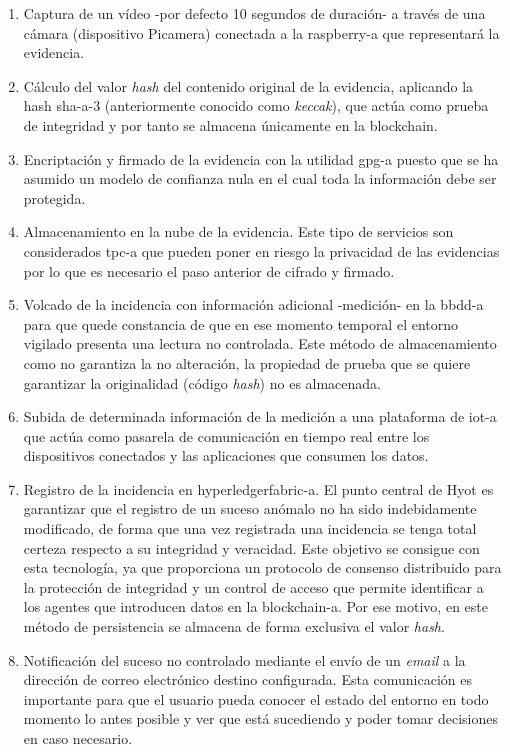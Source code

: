 \documentclass[12pt,a4paper, twoside]{report}
\begin{document}
	\begin{enumerate}
		\item Captura de un vídeo -por defecto 10 segundos de duración- a través de una cámara (dispositivo Picamera) conectada a la \gls{raspberry-a} que representará la evidencia.
		\item Cálculo del valor \textit{hash} del contenido original de la evidencia, aplicando la \gls{hash} \gls{sha-a}-3 (anteriormente conocido como \textit{keccak}), que actúa como prueba de integridad y por tanto se almacena únicamente en la \Gls{blockchain}. 
		\item Encriptación y firmado de la evidencia con la utilidad \gls{gpg-a} puesto que se ha asumido un modelo de confianza nula en el cual toda la información debe ser protegida.
		\item Almacenamiento en la nube de la evidencia. Este tipo de servicios son considerados \gls{tpc-a} que pueden poner en riesgo la privacidad de las evidencias por lo que es necesario el paso anterior de cifrado y firmado.	
		\item Volcado de la incidencia con información adicional -medición- en la \gls{bbdd-a} para que quede constancia de que en ese momento temporal el entorno vigilado presenta una lectura no controlada. Este método de almacenamiento como no garantiza la no alteración, la propiedad de prueba que se quiere garantizar la originalidad (código \textit{hash}) no es almacenada.
		\item Subida de determinada información de la medición a una plataforma de \gls{iot-a} que actúa como pasarela de comunicación en tiempo real entre los dispositivos conectados y las aplicaciones que consumen los datos. %
		\item Registro de la incidencia	en \gls{hyperledgerfabric-a}. El punto central de Hyot es garantizar que el registro de un suceso anómalo no ha sido indebidamente modificado, de forma que una vez registrada una incidencia se tenga total certeza respecto a su integridad y veracidad. Este objetivo se consigue con esta tecnología, ya que proporciona un protocolo de consenso distribuido para la protección de integridad y un control de acceso que permite identificar a los agentes que introducen datos en la \Gls{blockchain-a}. Por ese motivo, en este método de persistencia se almacena de forma exclusiva el valor \textit{hash}.

		\item Notificación del suceso no controlado mediante el envío de un \textit{email} a la dirección de correo electrónico destino configurada. Esta comunicación es importante para que el usuario pueda conocer el estado del entorno en todo momento lo antes posible y ver que está sucediendo y poder tomar decisiones en caso necesario.
	
	\end{enumerate}
		
\end{document}
